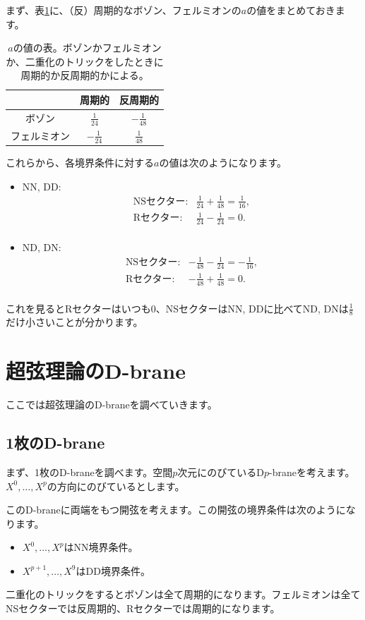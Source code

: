 \documentclass[report,paper=a4, fontsize=12pt, line_length=16cm, number_of_lines=34,dvipdfmx]{jlreq}
\numberwithin{equation}{chapter}
\numberwithin{equation}{section}
\begin{document}
まず、表\ref{tab:bosonfermiona}に、（反）周期的なボゾン、フェルミオンの$a$の値をまとめておきます。
\begin{table}[htbp]
  \centering
  \begin{tabular}{|c||c|c|}\hline
    & 周期的 & 反周期的 \\ \hline\hline
  ボゾン & $\frac{1}{24}$ & $-\frac{1}{48}$\\ \hline
  フェルミオン & $-\frac{1}{24}$&  $\frac{1}{48}$\\ \hline
  \end{tabular}
  \caption{$a$の値の表。ボゾンかフェルミオンか、二重化のトリックをしたときに周期的か反周期的かによる。}
  \label{tab:bosonfermiona}
\end{table}

これらから、各境界条件に対する$a$の値は次のようになります。
\begin{itemize}
  \item NN, DD: 
  \begin{align}
    \text{NSセクター:}& \frac{1}{24}+\frac{1}{48}=\frac{1}{16}, \nonumber\\
    \text{Rセクター:}& \frac{1}{24}-\frac{1}{24}=0. \nonumber\\
  \end{align} 
  \item ND, DN: 
  \begin{align}
    \text{NSセクター:}& -\frac{1}{48}-\frac{1}{24}=-\frac{1}{16}, \nonumber\\
    \text{Rセクター:}& -\frac{1}{48}+\frac{1}{48}=0. \nonumber\\
  \end{align} 
\end{itemize}
これを見るとRセクターはいつも$0$、NSセクターはNN, DDに比べてND, DNは$\frac18$だけ小さいことが分かります。

\section{超弦理論のD-brane}
ここでは超弦理論のD-braneを調べていきます。

\subsection{1枚のD-brane}
まず、1枚のD-braneを調べます。空間$p$次元にのびているD$p$-braneを考えます。$X^{0},\dots,X^{p}$の方向にのびているとします。

このD-braneに両端をもつ開弦を考えます。この開弦の境界条件は次のようになります。
\begin{itemize}
  \item $X^{0},\dots,X^{p}$はNN境界条件。
  \item $X^{p+1},\dots,X^{9}$はDD境界条件。
\end{itemize}
二重化のトリックをするとボゾンは全て周期的になります。フェルミオンは全てNSセクターでは反周期的、Rセクターでは周期的になります。
\end{document}
